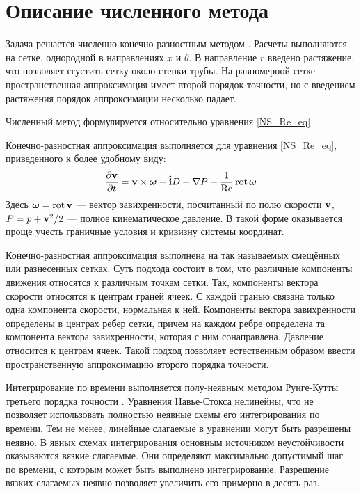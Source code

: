 \section{Описание численного метода}


Задача решается численно конечно-разностным методом \cite{Nikitin2006Method}. Расчеты выполняются на сетке, однородной в направлениях $x$ и $\theta$. В направление $r$ введено растяжение, что позволяет сгустить сетку около стенки трубы. На равномерной сетке пространственная аппроксимация имеет второй порядок точности, но с введением растяжения порядок аппроксимации несколько падает. 



Численный метод формулируется относительно уравнения \eqref{NS_Re_eq}

Конечно-разностная аппроксимация выполняется для уравнения \eqref{NS_Re_eq}, приведенного к более удобному виду: 
\begin{equation}\label{NS_GL_eq}
\frac{\partial \mathbf{v}}{\partial t} = \mathbf{v} \times \mbox{\boldmath$\omega$} - \mathbf{\hat{i}} D - \nabla P + \frac{1}{\operatorname{Re}} \operatorname{rot} \mbox{\boldmath$\omega$}
\end{equation}
Здесь $\mbox{\boldmath$\omega$} = \operatorname{rot} \mathbf{v}$ --- вектор завихренности, посчитанный по полю скорости $\mathbf{v}$, $P = p + \mathbf{v}^2/2$ --- полное кинематическое давление. В такой форме оказывается проще учесть граничные условия и кривизну системы координат. 


Конечно-разностная аппроксимация выполнена на так называемых смещённых или разнесенных сетках. Суть подхода состоит в том, что различные компоненты движения относятся к различным точкам сетки. Так, компоненты вектора скорости относятся к центрам граней ячеек. С каждой гранью связана только одна компонента скорости, нормальная к ней. Компоненты вектора завихренности определены в центрах ребер сетки, причем на каждом ребре определена та компонента вектора завихренности, которая с ним сонаправлена. Давление относится к центрам ячеек. Такой подход позволяет естественным образом ввести пространственную аппроксимацию второго порядка точности. 


Интегрирование по времени выполняется полу-неявным методом Рунге-Кутты третьего порядка точности \cite{Nikitin2006Third}. Уравнения Навье-Стокса нелинейны, что не позволяет использовать полностью неявные схемы его интегрирования по времени. Тем не менее, линейные слагаемые в уравнении могут быть разрешены неявно. В явных схемах интегрирования основным источником неустойчивости оказываются вязкие слагаемые. Они определяют максимально допустимый шаг по времени, с которым может быть выполнено интегрирование. Разрешение вязких слагаемых неявно позволяет увеличить его примерно в десять раз. 


